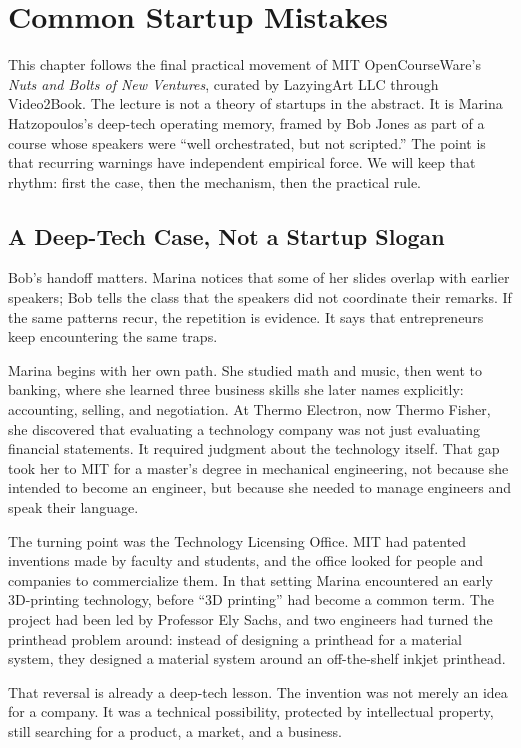 \chapter{Common Startup Mistakes}

This chapter follows the final practical movement of MIT OpenCourseWare's \emph{Nuts and Bolts of New Ventures}, curated by LazyingArt LLC through Video2Book. The lecture is not a theory of startups in the abstract. It is Marina Hatzopoulos's deep-tech operating memory, framed by Bob Jones as part of a course whose speakers were ``well orchestrated, but not scripted.'' The point is that recurring warnings have independent empirical force. We will keep that rhythm: first the case, then the mechanism, then the practical rule.

\section{A Deep-Tech Case, Not a Startup Slogan}

Bob's handoff matters. Marina notices that some of her slides overlap with earlier speakers; Bob tells the class that the speakers did not coordinate their remarks. If the same patterns recur, the repetition is evidence. It says that entrepreneurs keep encountering the same traps.

Marina begins with her own path. She studied math and music, then went to banking, where she learned three business skills she later names explicitly: accounting, selling, and negotiation. At Thermo Electron, now Thermo Fisher, she discovered that evaluating a technology company was not just evaluating financial statements. It required judgment about the technology itself. That gap took her to MIT for a master's degree in mechanical engineering, not because she intended to become an engineer, but because she needed to manage engineers and speak their language.

The turning point was the Technology Licensing Office. MIT had patented inventions made by faculty and students, and the office looked for people and companies to commercialize them. In that setting Marina encountered an early 3D-printing technology, before ``3D printing'' had become a common term. The project had been led by Professor Ely Sachs, and two engineers had turned the printhead problem around: instead of designing a printhead for a material system, they designed a material system around an off-the-shelf inkjet printhead.

That reversal is already a deep-tech lesson. The invention was not merely an idea for a company. It was a technical possibility, protected by intellectual property, still searching for a product, a market, and a business.

